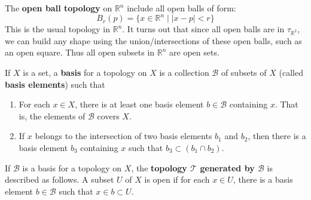 \documentclass{article}
\begin{document}
    \begin{example}
    The \textbf{open ball topology} on $\mathbb{R}^{n}$ include all open balls of form: 
    \[ B_{r}(p) = \{ x \in \mathbb{R}^{n} \; | \; |x-p| < r \} \]
    This is the usual topology in $\mathbb{R}^{n}$. It turns out that since all open balls are in $\tau_{\mathbb{R}^{2}}$, we can build any shape using the union/intersections of these open balls, such as an open square. Thus all open subsets in $\mathbb{R}^{n}$ are open sets. 
    \end{example}

    \begin{definition}
    If $X$ is a set, a \textbf{basis} for a topology on $X$ is a collection $\mathscr{B}$ of subsets of $X$ (called \textbf{basis elements}) such that
    \begin{enumerate}
        \item For each $x \in X$, there is at least one basis element $b \in \mathscr{B}$ containing $x$. That is, the elements of $\mathscr{B}$ covers $X$. 
        \item If $x$ belongs to the intersection of two basis elements $b_1$ and $b_2$, then there is a basis element $b_3$ containing $x$ such that $b_3 \subset (b_1 \cap b_2)$. 
    \end{enumerate}
    \begin{center}
    \end{center}
    \end{definition}

    \begin{definition}
    If $\mathscr{B}$ is a basis for a topology on $X$, the \textbf{topology $\mathscr{T}$ generated by $\mathscr{B}$} is described as follows. A subset $U$ of $X$ is open if for each $x \in U$, there is a basis element $b \in \mathscr{B}$ such that $x \in b \subset U$. 
    \end{definition}
    \begin{center}
    \end{center}
\end{document}

